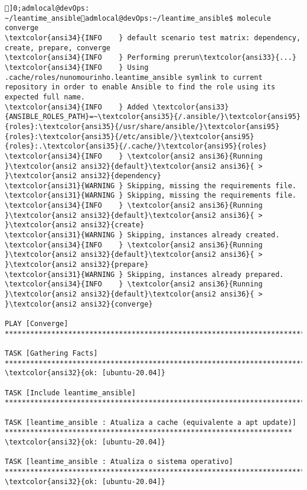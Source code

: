 \documentclass{scrartcl}
\begin{document}
\begin{Verbatim}
]0;admlocal@devOps: ~/leantime_ansibleadmlocal@devOps:~/leantime_ansible$ molecule converge
\textcolor{ansi34}{INFO    } default scenario test matrix: dependency, create, prepare, converge
\textcolor{ansi34}{INFO    } Performing prerun\textcolor{ansi33}{...}
\textcolor{ansi34}{INFO    } Using .cache/roles/nunomourinho.leantime_ansible symlink to current repository in order to enable Ansible to find the role using its expected full name.
\textcolor{ansi34}{INFO    } Added \textcolor{ansi33}{ANSIBLE_ROLES_PATH}=~\textcolor{ansi35}{/.ansible/}\textcolor{ansi95}{roles}:\textcolor{ansi35}{/usr/share/ansible/}\textcolor{ansi95}{roles}:\textcolor{ansi35}{/etc/ansible/}\textcolor{ansi95}{roles}:.\textcolor{ansi35}{/.cache/}\textcolor{ansi95}{roles}
\textcolor{ansi34}{INFO    } \textcolor{ansi2 ansi36}{Running }\textcolor{ansi2 ansi32}{default}\textcolor{ansi2 ansi36}{ > }\textcolor{ansi2 ansi32}{dependency}
\textcolor{ansi31}{WARNING } Skipping, missing the requirements file.
\textcolor{ansi31}{WARNING } Skipping, missing the requirements file.
\textcolor{ansi34}{INFO    } \textcolor{ansi2 ansi36}{Running }\textcolor{ansi2 ansi32}{default}\textcolor{ansi2 ansi36}{ > }\textcolor{ansi2 ansi32}{create}
\textcolor{ansi31}{WARNING } Skipping, instances already created.
\textcolor{ansi34}{INFO    } \textcolor{ansi2 ansi36}{Running }\textcolor{ansi2 ansi32}{default}\textcolor{ansi2 ansi36}{ > }\textcolor{ansi2 ansi32}{prepare}
\textcolor{ansi31}{WARNING } Skipping, instances already prepared.
\textcolor{ansi34}{INFO    } \textcolor{ansi2 ansi36}{Running }\textcolor{ansi2 ansi32}{default}\textcolor{ansi2 ansi36}{ > }\textcolor{ansi2 ansi32}{converge}

PLAY [Converge] **************************************************************************************************************************

TASK [Gathering Facts] *******************************************************************************************************************
\textcolor{ansi32}{ok: [ubuntu-20.04]}

TASK [Include leantime_ansible] **********************************************************************************************************

TASK [leantime_ansible : Atualiza a cache (equivalente a apt update)] ********************************************************************
\textcolor{ansi32}{ok: [ubuntu-20.04]}

TASK [leantime_ansible : Atualiza o sistema operativo] ***********************************************************************************
\textcolor{ansi32}{ok: [ubuntu-20.04]}


\end{Verbatim}
\end{document}
